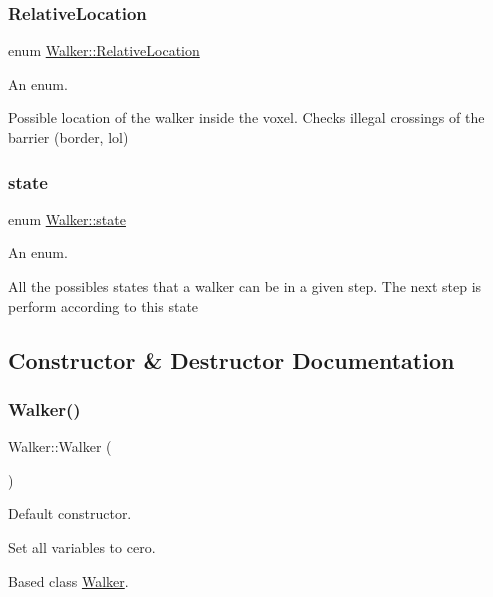 \subsubsection{\texorpdfstring{Relative\+Location}{RelativeLocation}}
{\footnotesize\ttfamily enum \hyperlink{class_walker_a24246136a10754791b05cb570dbb8417}{Walker\+::\+Relative\+Location}}



An enum. 

Possible location of the walker inside the voxel. Checks illegal crossings of the barrier (border, lol) \mbox{\label{class_walker_afcad3f5c11d0bd045de22fb0347dc44c}} 
\subsubsection{\texorpdfstring{state}{state}}
{\footnotesize\ttfamily enum \hyperlink{class_walker_afcad3f5c11d0bd045de22fb0347dc44c}{Walker\+::state}}



An enum. 

All the possibles states that a walker can be in a given step. The next step is perform according to this state 

\subsection{Constructor \& Destructor Documentation}
\mbox{\label{class_walker_acc0931305bedcf81ff621c31cdf2a92c}} 
\subsubsection{\texorpdfstring{Walker()}{Walker()}\hspace{0.1cm}{\footnotesize\ttfamily [1/2]}}
{\footnotesize\ttfamily Walker\+::\+Walker (\begin{DoxyParamCaption}{ }\end{DoxyParamCaption})}



Default constructor. 

Set all variables to cero.

Based class \hyperlink{class_walker}{Walker}. \mbox{\label{class_walker_a562c14b600628c18ac689464bd0f7e35}} 
